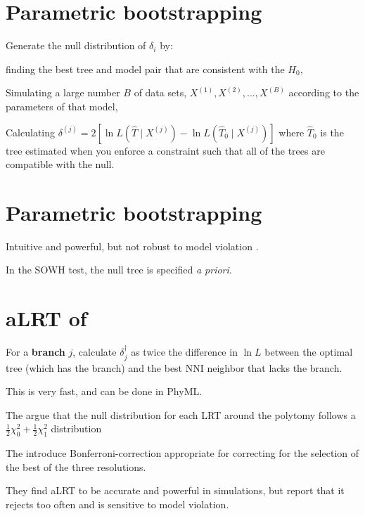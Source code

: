 \documentclass[landscape]{foils}
\begin{document}
\myNewSlide
\section*{Parametric bootstrapping}
Generate the null distribution of $\delta_i$ by:
\begin{compactitem}
	\item finding the best tree and model pair that are consistent with the $H_0$,
	\item Simulating a large number $B$ of data sets, $X^{(1)}, X^{(2)},\ldots,X^{(B)}$ according to the parameters of that model,
	\item Calculating $\delta^{(j)} = 2\left[\ln L (\hat{T} \mid  X^{(j)}) - \ln L (\hat{T}_{0} \mid  X^{(j)})\right]$ where $\hat{T}_{0}$ is the tree estimated when you enforce a constraint such that all of the trees are compatible with the null.
\end{compactitem}

\myNewSlide
\section*{Parametric bootstrapping}
Intuitive and powerful, but not robust to model violation \citep{Buckley2002}.

In the SOWH test, the null tree is specified {\em a priori}.

\myNewSlide
 


\myNewSlide
 

\myNewSlide
\section*{aLRT of \citet{AnisimovaG2006}}
\begin{compactitem}
	\item For a {\bf branch} $j$, calculate $\delta_{j}^{\dag}$ as twice the difference in $\ln L$ between the optimal tree (which has the branch) and the best NNI neighbor that lacks the branch.
	\item This is very fast, and can be done in PhyML.
	\item The argue that the null distribution for each LRT around the polytomy follows a $\frac{1}{2}\chi_0^2 + \frac{1}{2}\chi_1^2$ distribution
	\item The introduce Bonferroni-correction appropriate for correcting for the selection of the best of the three resolutions.
	\item They find aLRT to be accurate and powerful in simulations, but \citet{AnisimovaGDDG2011} report that it rejects too often and is sensitive to model violation.
\end{compactitem}
\end{document}
